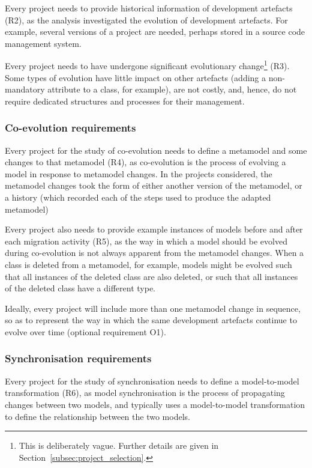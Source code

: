Every project needs to provide historical information of development artefacts (R2), as the analysis investigated the evolution of development artefacts. For example, several versions of a project are needed, perhaps stored in a source code management system.

Every project needs to have undergone significant evolutionary change\footnote{This is deliberately vague. Further details are given in Section~\ref{subsec:project_selection}.} (R3). Some types of evolution have little impact on other artefacts (adding a non-mandatory attribute to a class, for example), are not costly, and, hence, do not require dedicated structures and processes for their management.

\subsubsection{Co-evolution requirements}
Every project for the study of co-evolution needs to define a metamodel and some changes to that metamodel (R4), as co-evolution is the process of evolving a model in response to metamodel changes. In the projects considered, the metamodel changes took the form of either another version of the metamodel, or a history (which recorded each of the steps used to produce the adapted metamodel)

Every project also needs to provide example instances of models before and after each migration activity (R5), as the way in which a model should be evolved during co-evolution is not always apparent from the metamodel changes. When a class is deleted from a metamodel, for example, models might be evolved such that all instances of the deleted class are also deleted, or such that all instances of the deleted class have a different type.

Ideally, every project will include more than one metamodel change in sequence, so as to represent the way in which the same development artefacts continue to evolve over time (optional requirement O1).

\subsubsection{Synchronisation requirements}
Every project for the study of synchronisation needs to define a model-to-model transformation (R6), as model synchronisation is the process of propagating changes between two models, and typically uses a model-to-model transformation to define the relationship between the two models. 


